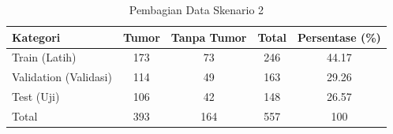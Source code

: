 \begin{table}[H]
	\centering
	\caption{Pembagian Data Skenario 2}
	\label{tab:dataset_val_test}
	\begin{tabular}{|l|c|c|c|c|}
		\hline
		\textbf{Kategori} & \textbf{Tumor} & \textbf{Tanpa Tumor} & \textbf{Total} & \textbf{Persentase (\%)} \\ \hline
		Train (Latih) & 173 & 73 & 246 & 44.17 \\ \hline
		Validation (Validasi) & 114 & 49 & 163 & 29.26 \\ \hline
		Test (Uji) & 106 & 42 & 148 & 26.57 \\ \hline
		Total & 393 & 164 & 557 & 100 \\ \hline
	\end{tabular}
\end{table}